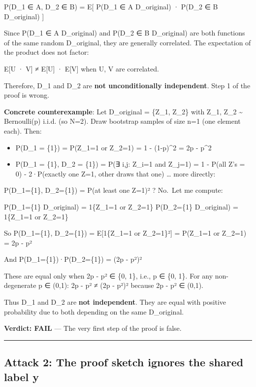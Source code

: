\documentclass[
  12pt,
]{article}
\providecommand{\tightlist}{%
  \setlength{\itemsep}{0pt}\setlength{\parskip}{0pt}}
\begin{document}
P(D\_1 ∈ A, D\_2 ∈ B) = E{[} P(D\_1 ∈ A \textbar{} D\_original) · P(D\_2
∈ B \textbar{} D\_original) {]}

Since P(D\_1 ∈ A \textbar{} D\_original) and P(D\_2 ∈ B \textbar{}
D\_original) are both functions of the same random D\_original, they are
generally correlated. The expectation of the product does not factor:

E{[}U · V{]} ≠ E{[}U{]} · E{[}V{]} when U, V are correlated.

Therefore, D\_1 and D\_2 are \textbf{not unconditionally independent}.
Step 1 of the proof is wrong.

\textbf{Concrete counterexample}: Let D\_original = \{Z\_1, Z\_2\} with
Z\_1, Z\_2 \textasciitilde{} Bernoulli(p) i.i.d. (so N=2). Draw
bootstrap samples of size n=1 (one element each). Then:

\begin{itemize}
\tightlist
\item
  P(D\_1 = \{1\}) = P(Z\_1=1 or Z\_2=1) = 1 - (1-p)\^{}2 = 2p - p\^{}2
\item
  P(D\_1 = \{1\}, D\_2 = \{1\}) = P(∃ i,j: Z\_i=1 and Z\_j=1) = 1 -
  P(all Z's = 0) - 2·P(exactly one Z=1, other draws that one) \ldots{}
  more directly:
\end{itemize}

P(D\_1=\{1\}, D\_2=\{1\}) = P(at least one Z=1)² ? No.~Let me compute:

P(D\_1=\{1\} \textbar{} D\_original) = 1\{Z\_1=1 or Z\_2=1\}
P(D\_2=\{1\} \textbar{} D\_original) = 1\{Z\_1=1 or Z\_2=1\}

So P(D\_1=\{1\}, D\_2=\{1\}) = E{[}1\{Z\_1=1 or Z\_2=1\}²{]} = P(Z\_1=1
or Z\_2=1) = 2p - p²

And P(D\_1=\{1\})·P(D\_2=\{1\}) = (2p - p²)²

These are equal only when 2p - p² ∈ \{0, 1\}, i.e., p ∈ \{0, 1\}. For
any non-degenerate p ∈ (0,1): 2p - p² ≠ (2p - p²)² because 2p - p² ∈
(0,1).

Thus D\_1 and D\_2 are \textbf{not independent}. They are equal with
positive probability due to both depending on the same D\_original.

\textbf{Verdict: FAIL} --- The very first step of the proof is false.

\begin{center}\rule{0.5\linewidth}{0.5pt}\end{center}

\subsection{Attack 2: The proof sketch ignores the shared label
y}\label{attack-2-the-proof-sketch-ignores-the-shared-label-y}
\end{document}
